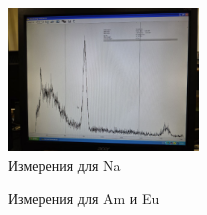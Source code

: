 \documentclass[a4paper, 12pt]{article}
\begin{document}
        \begin{figure}[ht!]
            \begin{center}
                \includegraphics[width = 0.45\textwidth]{img/na.jpg}
                \caption{Измерения для Na}
                \label{img:na}
            \end{center}
        \end{figure}

        \begin{figure}[ht!]
            \centering
            \qquad
            \caption{Измерения для Am и Eu}%
            \label{img:am_eu}%
        \end{figure}
\end{document}
